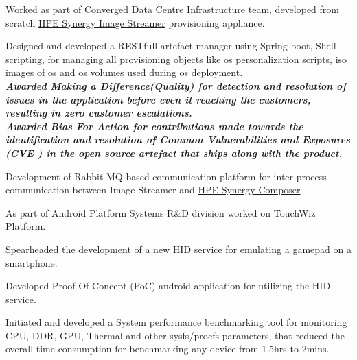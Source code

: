 \documentclass[]{kushal-resume}
\begin{document}
\begin{minipage}[t]{0.66\textwidth}
\begin{tightemize}
\item Worked as part of Converged Data Centre Infrastructure team, developed from scratch
\href{https://buy.hpe.com/us/en/synergy/synergy-management/synergy-image-streamer/synergy-image-streamer/hpe-synergy-image-streamer/p/1008615214}{HPE Synergy Image Streamer} provisioning appliance. 
\item Designed and developed a RESTfull artefact manager using Spring boot, Shell scripting, for managing all provisioning objects like os personalization scripts, iso images of os and os volumes used during os deployment. \\
	    {\footnotesize \textit{\textbf{Awarded Making a Difference(Quality) for detection and resolution of issues in the application before even it reaching the customers, resulting in zero customer escalations. }}} \\
	    {\footnotesize \textit{\textbf{Awarded Bias For Action for contributions made towards the identification and resolution of Common Vulnerabilities and Exposures (CVE ) in the open source artefact that ships along with the product. }}}  \\
 \item Development of Rabbit MQ based communication platform for inter process communication between Image Streamer and \href{https://buy.hpe.com/us/en/synergy/synergy-management/synergy-composer/synergy-composer/hpe-synergy-composer/p/1008615209}{HPE Synergy Composer}
\end{tightemize}
\sectionsep

\begin{tightemize}
\item As part of Android Platform Systems R\&D division worked on TouchWiz Platform.
\item Spearheaded the development of a new HID  service for emulating a gamepad on a smartphone.
\item Developed Proof Of Concept (PoC) android application for utilizing the HID service.
\item Initiated and developed a System performance benchmarking tool for monitoring CPU, DDR, GPU, Thermal and other sysfs/procfs parameters, that reduced the overall time consumption for benchmarking any device from 1.5hrs to 2mins.
\end{tightemize}
\sectionsep


\end{minipage}
\end{document}
